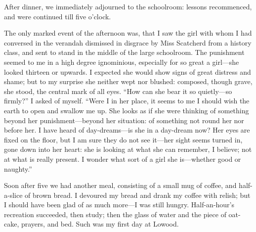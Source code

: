 After dinner, we immediately adjourned to the schoolroom: lessons
recommenced, and were continued till five o'clock.

The only marked event of the afternoon was, that I saw the girl with
whom I had conversed in the verandah dismissed in disgrace by Miss
Scatcherd from a history class, and sent to stand in the middle of the
large schoolroom. The punishment seemed to me in a high degree
ignominious, especially for so great a girl---she looked thirteen or
upwards. I expected she would show signs of great distress and shame;
but to my surprise she neither wept nor blushed: composed, though grave,
she stood, the central mark of all eyes. \enquote{How can she bear it
so quietly---so firmly?} I asked of myself. \enquote{Were I in her
place, it seems to me I should wish the earth to open and swallow me
up. She looks as if she were thinking of something beyond her
punishment---beyond her situation: of something not round her nor before
her. I have heard of day-dreams---is she in a day-dream now? Her eyes
are fixed on the floor, but I am sure they do not see it---her sight
seems turned in, gone down into her heart: she is looking at what she
can remember, I believe; not at what is really present. I wonder what
sort of a girl she is---whether good or naughty.}

Soon after five \PM{} we had another meal, consisting of a small mug of
coffee, and half-a-slice of brown bread. I devoured my bread and drank
my coffee with relish; but I should have been glad of as much more---I
was still hungry. Half-an-hour's recreation succeeded, then study; then
the glass of water and the piece of oat-cake, prayers, and bed. Such
was my first day at Lowood.
